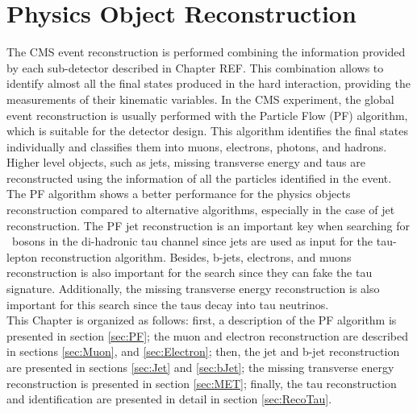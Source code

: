 \chapter[Physics Object Reconstruction]{Physics Object Reconstruction}
\label{chap:ParticleID}

The CMS event reconstruction is performed combining the information 
provided by each sub-detector described in Chapter REF. This 
combination allows to identify almost all the final states produced 
in the hard interaction, providing the measurements 
of their kinematic variables. In the CMS experiment, the global 
event reconstruction is usually performed with the Particle 
Flow (PF) algorithm, which is suitable for the detector
design. This algorithm identifies the final states individually 
and classifies them into muons, electrons, photons, and hadrons. Higher 
level objects, such as jets, missing transverse energy and taus are 
reconstructed using the information of all the particles identified 
in the event. The PF algorithm shows a better performance for the 
physics objects reconstruction compared to alternative 
algorithms, especially in the case of jet reconstruction. The PF jet reconstruction 
is an important key when searching for \Zprime~bosons in the di-hadronic tau 
channel since jets are used as input for the tau-lepton reconstruction 
algorithm. Besides, b-jets, electrons, and muons reconstruction is
also important for the search since they can fake the tau signature. Additionally,
the missing transverse energy reconstruction is also important for 
this search since the taus decay into tau neutrinos.\\

\noindent This Chapter is organized as follows: first, a description of the PF algorithm is 
presented in section \ref{sec:PF}; the muon and electron reconstruction are described in
sections \ref{sec:Muon}, and \ref{sec:Electron}; then, the jet and b-jet 
reconstruction are presented in sections \ref{sec:Jet} and \ref{sec:bJet}; the missing 
transverse energy reconstruction is presented in section  \ref{sec:MET}; finally, the tau reconstruction 
and identification are presented in detail in section \ref{sec:RecoTau}.\\





